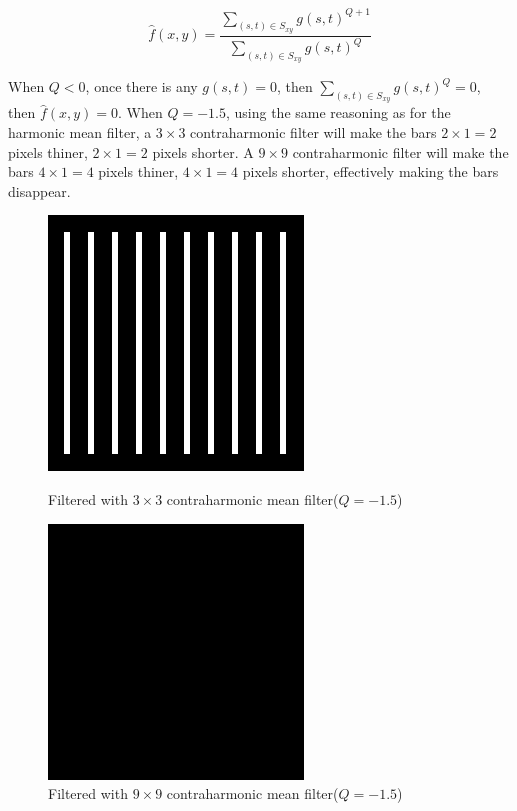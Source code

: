 \documentclass{article}
\begin{document}
$$
\hat{f}(x, y) = \frac{\sum_{(s, t)\in S_{xy}} g(s, t)^{Q+1}}{\sum_{(s, t)\in S_{xy}} g(s, t)^Q}
$$

When $Q < 0$, once there is any $g(s, t) = 0$, then $\sum_{(s, t)\in S_{xy}} g(s, t)^{Q} = 0$, then $\hat{f}(x, y) = 0$. When $Q = -1.5$, using the same reasoning as for the harmonic mean filter, a $3 \times 3$ contraharmonic filter will make the bars $2 \times 1 = 2$ pixels thiner, $2 \times 1 = 2$ pixels shorter. A $9 \times 9$ contraharmonic filter will make the bars $4 \times 1 = 4$ pixels thiner, $4 \times 1 = 4$ pixels shorter, effectively making the bars disappear.

\begin{figure}[H]
	\captionsetup{justification=centering,margin=0.5cm}
	\begin{minipage}[b]{0.48\linewidth}
		\centering
		\includegraphics[width=192pt]{../result/task1/contraharmonic-mean-3-3.png}
		\caption{Filtered with $3 \times 3$ contraharmonic mean filter($Q=-1.5$)}
		\label{fig:barchm33}
	\end{minipage}
	\begin{minipage}[b]{0.48\linewidth}
		\centering
		\includegraphics[width=192pt]{../result/task1/contraharmonic-mean-9-9.png}
		\caption{Filtered with $9 \times 9$ contraharmonic mean filter($Q=-1.5$)}
		\label{fig:barchm99}
	\end{minipage}
\end{figure}
\end{document}
